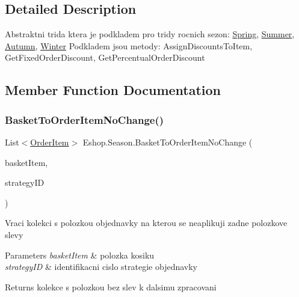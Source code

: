 \subsection{Detailed Description}
Abstraktni trida ktera je podkladem pro tridy rocnich sezon\+: \mbox{\hyperlink{class_eshop_1_1_spring}{Spring}}, \mbox{\hyperlink{class_eshop_1_1_summer}{Summer}}, \mbox{\hyperlink{class_eshop_1_1_autumn}{Autumn}}, \mbox{\hyperlink{class_eshop_1_1_winter}{Winter}} Podkladem jsou metody\+: Assign\+Discounts\+To\+Item, Get\+Fixed\+Order\+Discount, Get\+Percentual\+Order\+Discount 



\subsection{Member Function Documentation}
\mbox{\label{class_eshop_1_1_season_a29ea0bffce6c50d8b463a30e6805e26f}} 
\subsubsection{\texorpdfstring{BasketToOrderItemNoChange()}{BasketToOrderItemNoChange()}}
{\footnotesize\ttfamily List$<$\mbox{\hyperlink{class_eshop_1_1_order_item}{Order\+Item}}$>$ Eshop.\+Season.\+Basket\+To\+Order\+Item\+No\+Change (\begin{DoxyParamCaption}\item[{Key\+Value\+Pair$<$ \mbox{\hyperlink{class_eshop_1_1_product}{Product}}, int $>$}]{basket\+Item,  }\item[{int}]{strategy\+ID }\end{DoxyParamCaption})}



Vraci kolekci s polozkou objednavky na kterou se neaplikuji zadne polozkove slevy 


\begin{DoxyParams}{Parameters}
{\em basket\+Item} & polozka kosiku\\
\hline
{\em strategy\+ID} & identifikacni cislo strategie objednavky\\
\hline
\end{DoxyParams}
\begin{DoxyReturn}{Returns}
kolekce s polozkou bez slev k dalsimu zpracovani
\end{DoxyReturn}
\mbox{\label{class_eshop_1_1_season_a3ebc704b1930bb304863e1c28058cbfa}} 
